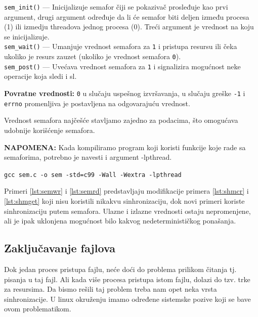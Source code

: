 \documentclass[a4paper, 11pt, twoside]{article}
\newcommand{\scode}[3] {
	\hspace{.06\textwidth} 
	\begin{minipage}[t]{.88\textwidth} %
		\begin{mdframed}[topline=true,bottomline=true,leftline=true,rightline=true,backgroundcolor=gray!22, linecolor=gray!60!black,roundcorner=1mm]
			 

	\begin{center}
		\caption{\textbf{Primer \ref{lst:#3}:} #2}
	\end{center}
	\end{mdframed}
	\end{minipage}

}
\begin{document}
\texttt{sem\_init()} --- Inicijalizuje semafor čiji se pokazivač prosleđuje kao prvi argument, drugi argument određuje da li će semafor biti deljen između procesa (1) ili izmedju threadova jednog procesa (0). Treći argument je vrednost na koju se inicijalizuje. \\
	\texttt{sem\_wait()} --- Umanjuje vrednost semafora za \texttt{1} i pristupa resursu ili čeka ukoliko je resurs zauzet (ukoliko je vrednost semafora \texttt{0}). \\
	\texttt{sem\_post()} --- Uvećava vrednost semafora za \texttt{1} i signalizira mogućnost neke operacije koja sledi i sl.

\textbf{Povratne vrednosti:} \texttt{0}  u slučaju uspešnog izvršavanja, u slučaju greške \texttt{-1} i \texttt{errno} promenljiva je postavljena na odgovarajuću vrednost.

Vrednost semafora najčešće stavljamo zajedno za podacima, što omogućava udobnije korišćenje semafora.

\scode{structsem.c}{Struktura koja sadrži semafore}{semstruct}


\vspace{2mm} 
 \textbf{NAPOMENA:} Kada kompiliramo program koji koristi funkcije koje rade sa semaforima, potrebno je navesti i argument -lpthread. 

\begin{center}
	\texttt{gcc sem.c -o sem -std=c99 -Wall -Wextra -lpthread} 
\end{center}



\newpage

Primeri \ref{lst:semwr} i \ref{lst:semrd} predstavljaju modifikacije  primera \ref{lst:shmcr} i \ref{lst:shmget} koji nisu koristili nikakvu sinhronizaciju, dok novi primeri koriste sinhronizaciju putem semafora. Ulazne i izlazne vrednosti ostaju nepromenjene, ali je ipak uklonjena mogućnost bilo kakvog nedeterminističkog ponašanja.

\scode{sem_shm_writer.c}{Modifikacija primera \ref{lst:shmcr}}{semwr}

\scode{sem_shm_reader.c}{Modifikacija primera \ref{lst:shmget}}{semrd}

\subsection{Zaključavanje fajlova}

Dok jedan proces pristupa fajlu, neće doći do problema prilikom čitanja tj. pisanja u taj fajl. Ali kada više procesa pristupa istom fajlu, dolazi do tzv. trke za resursima. Da bismo rešili taj problem treba nam opet neka vrsta sinhronizacije. U linux okruženju imamo određene sistemske pozive koji se bave ovom problematikom.
\end{document}
